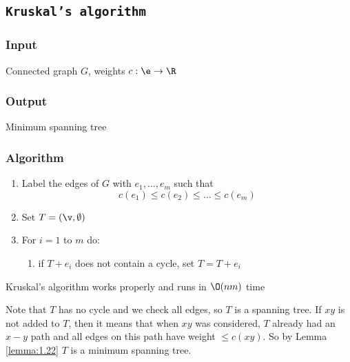 \subsection{\texttt{Kruskal's algorithm}}
\subsubsection{Input}
Connected graph $G$, weights $c: \e \rightarrow \R$
\subsubsection{Output}
Minimum spanning tree
\subsubsection{Algorithm}
\begin{enumerate}
    \item Label the edges of $G$ with $e_1, \dots, e_m$ such that
    \begin{equation*}
        c(e_1) \leq c(e_2) \leq \dots \leq c(e_m)
    \end{equation*}
    \item Set $T = (\v, \emptyset)$
    \item For $i = 1$ to $m$ do:
    \begin{enumerate}
        \item if $T + e_i$ does not contain a cycle, set $T = T + e_i$
    \end{enumerate}
\end{enumerate}
\begin{theorem}
    Kruskal's algorithm works properly and runs in $\O(nm)$ time
\end{theorem}
\begin{prf}
    Note that $T$ has no cycle and we check all edges, so $T$ is a spanning tree. If $xy$ is not added to $T$, then it means that when $xy$ was considered, $T$ already had an $x - y$ path and all edges on this path have weight $\leq c(xy)$. So by Lemma \ref{lemma:1.22} $T$ is a minimum spanning tree.
\end{prf}
